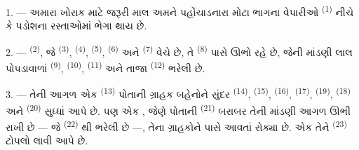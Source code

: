 %

\VUsaut{4.0mm}
\VUsaut{3.0mm}

\VUsaut{3.0mm}

1. --- અમારા ખોરાક માટે જરૂરી માલ અમને પહોંચાડનારા મોટા ભાગના વેપારીઓ
  \textsuperscript{(1)} નીચે કે
પડોશના રસ્તાઓમાં ભેગા થાય છે.

2. ---  \textsuperscript{(2)}, જે
 \textsuperscript{(3)}, 
\textsuperscript{(4)},  \textsuperscript{(5)},
 \textsuperscript{(6)} અને 
\textsuperscript{(7)} વેચે છે, તે 
\textsuperscript{(8)} પાસે ઊભો રહે છે, જેની માંડણી લાલ પોપડાવાળાં
 \textsuperscript{(9)}, 
\textsuperscript{(10)}, 
\textsuperscript{(11)} અને તાજા 
\textsuperscript{(12)} ભરેલી છે.

3. --- તેની આગળ એક  \textsuperscript{(13)}
પોતાની ગ્રાહક બહેનોને સુંદર  \textsuperscript{(14)},
 \textsuperscript{(15)}, 
\textsuperscript{(16)},  \textsuperscript{(17)},
 \textsuperscript{(19)}, 
\textsuperscript{(18)} અને  \textsuperscript{(20)}
સુધ્ધાં આપે છે. પણ એક , જેણે પોતાની
 \textsuperscript{(21)} બરાબર તેની માંડણી
આગળ ઊભી રાખી છે --- જે  \textsuperscript{(22)} થી
ભરેલી છે ---, તેના ગ્રાહકોને પાસે આવતાં રોક્યા છે. એક  તેને
 \textsuperscript{(23)} ટોપલો લાવી આપે છે.

